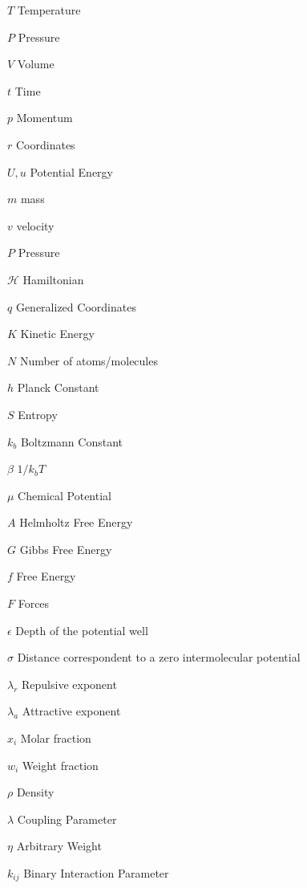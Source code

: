 \documentclass[
	12pt,				%
	openany,			%
	oneside,			%
	a4paper,			%
	english,			%
	brazil				%
	]{abntex2}
\begin{document}
\begin{simbolos}
  \item[$T$] Temperature
  \item[$P$] Pressure
  \item[$V$] Volume
  \item[$t$] Time
  \item[$p$] Momentum
  \item[$r$] Coordinates
  \item[$U,u$] Potential Energy
  \item[$m$] mass
  \item[$v$] velocity
  \item[$P$] Pressure
  \item[$ \mathcal{H} $] Hamiltonian
  \item[$q$] Generalized Coordinates
  \item[$K $] 	Kinetic Energy 
  \item[$N$] Number of atoms/molecules
  \item[$h$] Planck Constant
  \item[$S$] Entropy
  \item[$k_{b}$] Boltzmann Constant
  \item[$\beta$] $1/k_{b}T$
  \item[$\mu$] Chemical Potential
  \item[$A$] Helmholtz Free Energy
  \item[$G$] Gibbs Free Energy
  \item[$f$] Free Energy
  \item[$F$] Forces
  \item[$\epsilon$] Depth of the potential well
  \item[$\sigma$] Distance correspondent to a zero intermolecular potential
  \item[$\lambda _{r}$] Repulsive exponent
  \item[$\lambda _{a}$] Attractive exponent
  \item[$x_{i}$] Molar fraction 
  \item[$w_{i}$] Weight fraction 
  \item[$\rho$] Density
  \item[$\lambda$] Coupling Parameter 
  \item[$\eta$] Arbitrary Weight 
  \item[$k_{ij}$] Binary Interaction Parameter
\end{simbolos}

\tableofcontents*
\cleardoublepage
\end{document}
